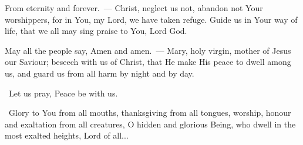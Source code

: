 \documentclass[12pt,twoside,a5paper]{article}
\begin{document}




\begin{halfparskip}
  From eternity and forever.~--- Christ, neglect us not, abandon not Your worshippers, for in You, my Lord, we have taken refuge. Guide us in Your way of life, that we all may sing praise to You, Lord God.

  May all the people say, Amen and amen.~--- Mary, holy virgin, mother of Jesus our Saviour; beseech with us of Christ, that He make His peace to dwell among us, and guard us from all harm by night and by day.
\end{halfparskip}


\rr~Let us pray, Peace be with us.

\cc~Glory to You from all mouths, thanksgiving from all tongues, worship, honour and exaltation from all creatures, O hidden and glorious Being, who dwell in the most exalted heights, Lord of all...





\end{document}
